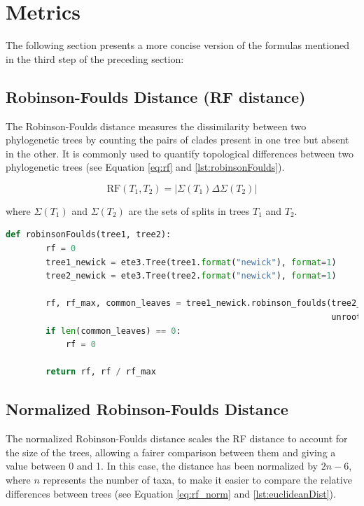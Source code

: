 \section{Metrics}\label{metrics}
The following section presents a more concise version of the formulas mentioned in the third step of the preceding section:

\subsection{Robinson-Foulds Distance (RF distance)}\label{RF}
The Robinson-Foulds distance measures the dissimilarity between two phylogenetic trees by counting the pairs of clades present in one tree but absent in the other. It is commonly used to quantify topological differences between two phylogenetic trees (see Equation \eqref{eq:rf} and \autoref{lst:robinsonFoulds}).

\begin{equation}\label{eq:rf}
    \text{RF}(T_1, T_2) = | \Sigma(T_1) \Delta \Sigma(T_2) |
\end{equation}

where $\Sigma(T_1)$ and $\Sigma(T_2)$ are the sets of splits in trees $T_1$ and $T_2$.

\begin{lstlisting}[label=lst:robinsonFoulds,language=Python,caption=Python script for calculating the Robinson-Foulds distance using the ete3 package in the aPhyloGeo package.]
    def robinsonFoulds(tree1, tree2):
        rf = 0
        tree1_newick = ete3.Tree(tree1.format("newick"), format=1)
        tree2_newick = ete3.Tree(tree2.format("newick"), format=1)

        rf, rf_max, common_leaves = tree1_newick.robinson_foulds(tree2_newick, 
                                                                 unrooted_trees=True)
        if len(common_leaves) == 0:
            rf = 0

        return rf, rf / rf_max
\end{lstlisting}


\subsection{Normalized Robinson-Foulds Distance}\label{RFnorm}
The normalized Robinson-Foulds distance scales the RF distance to account for the size of the trees, allowing a fairer comparison between them and giving a value between 0 and 1. In this case, the distance has been normalized by $2n-6$, where $n$ represents the number of taxa, to make it easier to compare the relative differences between trees (see Equation \eqref{eq:rf_norm} and \autoref{lst:euclideanDist}).

